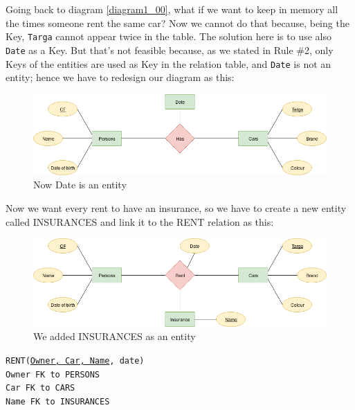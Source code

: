 \documentclass[12pt, oneside]{report}
\newcommand\tab[1][1cm]{\hspace*{#1}}
\begin{document}
Going back to diagram \ref{diagram1_00}, what if we want to keep in memory all the times someone rent the same car?
Now we cannot do that because, being the Key, \texttt{Targa} cannot appear twice in the table.
The solution here is to use also \texttt{Date} as a Key.
But that's not feasible because, as we stated in Rule \#2, only Keys of the entities are used as Key in the relation table, and \texttt{Date} is not an entity; hence we have to redesign our diagram as this:
\begin{figure}[H]
	\centering
	\includegraphics[width=\textwidth,keepaspectratio]{diagram1_03.png}
	\caption{Now Date is an entity}
	\label{diagram1_03}
\end{figure}
\vskip 20pt

Now we want every rent to have an insurance, so we have to create a new entity called INSURANCES and link it to the RENT relation as this:
\begin{figure}[H]
	\centering
	\includegraphics[width=\textwidth,keepaspectratio]{diagram1_04.png}
	\caption{We added INSURANCES as an entity}
	\label{diagram1_04}
\end{figure}
\texttt{RENT(\underline{Owner, Car, Name}, date)}\\
	\tab[.8cm] \texttt{Owner FK to PERSONS}\\
	\tab[.8cm] \texttt{Car FK to CARS}\\
	\tab[.8cm] \texttt{Name FK to INSURANCES}
\vskip 20pt
\end{document}
